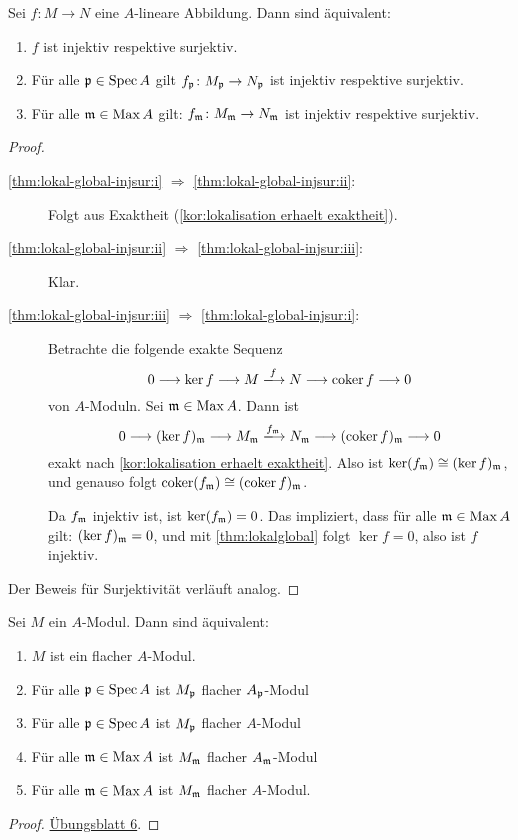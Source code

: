 \documentclass[12pt,a4paper]{scrartcl}
\theoremstyle{cplain}
\theoremstyle{cdef}
\begin{document}
\begin{satz}
	Sei $f\colon M\to N$ eine $A$-lineare Abbildung. Dann sind äquivalent:
	\begin{enumerate}
		\item $f$ ist injektiv respektive surjektiv. \label{thm:lokal-global-injsur:i}
		\item Für alle $\mathfrak{p}\in \operatorname{Spec} A$ gilt $f_{\mathfrak{p}}\colon M_{\mathfrak{p}}\to N_{\mathfrak{p}}$ ist injektiv respektive surjektiv. \label{thm:lokal-global-injsur:ii}
		\item Für alle $\mathfrak{m}\in \operatorname{Max} A$ gilt: $f_{\mathfrak{m}}\colon M_{\mathfrak{m}}\to N_{\mathfrak{m}}$ ist injektiv respektive surjektiv. \label{thm:lokal-global-injsur:iii}
	\end{enumerate}
\end{satz}
\begin{proof}
	\leavevmode
	\begin{description}
		\item[\ref{thm:lokal-global-injsur:i} $\Rightarrow$ \ref{thm:lokal-global-injsur:ii}:] Folgt aus Exaktheit (\cref{kor:lokalisation erhaelt exaktheit}).
		\item[\ref{thm:lokal-global-injsur:ii} $\Rightarrow$ \ref{thm:lokal-global-injsur:iii}:] Klar.
		\item[\ref{thm:lokal-global-injsur:iii} $\Rightarrow$ \ref{thm:lokal-global-injsur:i}:] Betrachte die folgende exakte Sequenz
		\[0\longrightarrow \ker f \longrightarrow M \xlongrightarrow{f} N\longrightarrow \coker f \longrightarrow 0\]
		von $A$-Moduln. Sei $\mathfrak{m}\in \operatorname{Max} A$. Dann ist 
		\[0\longrightarrow (\ker f)_\fm \longrightarrow M_\fm \xlongrightarrow{f_\fm} N_\fm\longrightarrow (\coker f)_\fm \longrightarrow 0\]
		exakt nach \cref{kor:lokalisation erhaelt exaktheit}. Also ist $\operatorname{ker}(f_{\mathfrak{m}}) \cong (\operatorname{ker} f)_{\mathfrak{m}}$, und genauso folgt $\operatorname{coker}(f_{\mathfrak{m}})\cong (\operatorname{coker} f)_{\mathfrak{m}}$.
		
		Da $f_{\mathfrak{m}}$ injektiv ist, ist $\operatorname{ker} (f_{\mathfrak{m}}) = 0$. Das impliziert, dass für alle $\mathfrak{m}\in \operatorname{Max} A$ gilt: $(\operatorname{ker} f)_{\mathfrak{m}} = 0$, und mit \cref{thm:lokalglobal} folgt $\ker f = 0$, also ist $f$ injektiv.
	\end{description}
	Der Beweis für Surjektivität verläuft analog.
\end{proof}

\begin{satz}
	Sei $M$ ein $A$-Modul. Dann sind äquivalent:
	\begin{enumerate}
		\item $M$ ist ein flacher $A$-Modul.
		\item Für alle $\mathfrak{p}\in\operatorname{Spec} A$ ist $M_{\mathfrak{p}}$ flacher $A_{\mathfrak{p}}$-Modul
		\item Für alle $\mathfrak{p}\in\operatorname{Spec} A$ ist $M_{\mathfrak{p}}$ flacher $A$-Modul
		\item Für alle $\mathfrak{m}\in\operatorname{Max} A$ ist $M_{\mathfrak{m}}$ flacher $A_{\mathfrak{m}}$-Modul
		\item Für alle $\mathfrak{m}\in\operatorname{Max} A$ ist $M_{\mathfrak{m}}$ flacher $A$-Modul.
	\end{enumerate}
	
\end{satz}
\begin{proof}
	\href{http://www.math.uni-bonn.de/ag/stroppel/Franzen_Algebra_1_Uebung/Blatt6a.pdf}{Übungsblatt 6}.
\end{proof}
\end{document}
